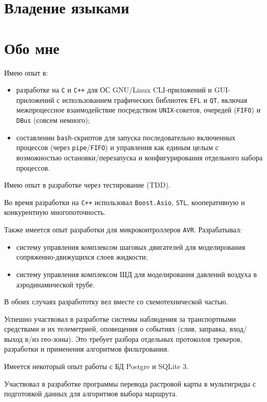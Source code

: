 \documentclass[11pt,a4paper,russian]{moderncv}
\begin{document}
\section{Владение языками}

\section{Обо мне}
\par{Имею опыт в:}
\begin{itemize}
\item разработке на \texttt{C} и \texttt{C++} для ОС GNU/Linux CLI-приложений и GUI-приложений с использованием графических библиотек \texttt{EFL} и \texttt{QT}, включая межпроцессное взаимодействие посредством \texttt{UNIX}-сокетов, очередей (\texttt{FIFO}) и \texttt{DBus} (совсем немного);
\item составлении \texttt{bash}-скриптов для запуска последовательно включенных процессов (через \texttt{pipe}/\texttt{FIFO}) и управления как единым целым с возможностью остановки/перезапуска и конфигурирования отдельного набора процессов.
\end{itemize}
\par{Имею опыт в разработке через тестирование (TDD).}
\par{Во время разработки на \texttt{C++} использовал \texttt{Boost.Asio}, \texttt{STL}, кооперативную и конкурентную многопоточность.}
\par{Также имеется опыт разработки для микроконтроллеров \texttt{AVR}. Разрабатывал:}
\begin{itemize}
\item систему управления комплексом шаговых двигателей для моделирования сопряженно-движущихся слоев жидкости;
\item систему управления комплексом ШД для моделирования давлений воздуха в аэродинамической трубе.
\end{itemize}
\par{В обоих случаях разработотку вел вместе со схемотехнической частью.}
\par{Успешно участвовал в разработке системы наблюдения за транспортными средствами и их телеметрией, оповещения о событиях (слив, заправка, вход/выход в/из гео-зоны). Это требует разбора отдельных протоколов трекеров, разработки и применения алгоритмов фильтрования.}
\par{Имеется некоторый опыт работы с БД Postgre и SQLite 3.}
\par{Участвовал в разработке программы перевода растровой карты в мультигриды с подготовкой данных для алгоритмов выбора маршрута.}
\end{document}
